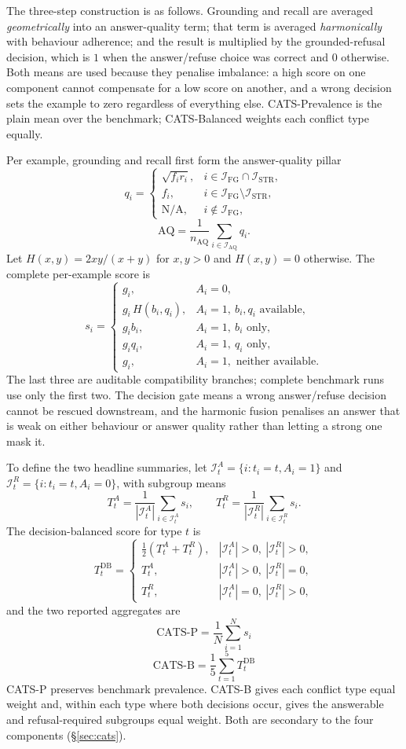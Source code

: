 The three-step construction is as follows. Grounding and recall are averaged
\emph{geometrically} into an answer-quality term; that term is averaged
\emph{harmonically} with behaviour adherence; and the result is multiplied by the
grounded-refusal decision, which is $1$ when the answer/refuse choice was correct
and $0$ otherwise. Both means are used because they penalise imbalance: a high
score on one component cannot compensate for a low score on another, and a wrong
decision sets the example to zero regardless of everything else. CATS-Prevalence
is the plain mean over the benchmark; CATS-Balanced weights each conflict type
equally.

Per example, grounding and recall first form the answer-quality pillar
\[
q_i=\begin{cases}
\sqrt{f_i r_i},& i\in\mathcal{I}_{\mathrm{FG}}\cap\mathcal{I}_{\mathrm{STR}},\\
f_i,& i\in\mathcal{I}_{\mathrm{FG}}\setminus\mathcal{I}_{\mathrm{STR}},\\
\text{N/A},& i\notin\mathcal{I}_{\mathrm{FG}},
\end{cases}
\]
\[
\mathrm{AQ}=\frac{1}{n_{\mathrm{AQ}}}\sum_{i\in\mathcal{I}_{\mathrm{AQ}}}q_i.
\]
Let $H(x,y)=2xy/(x+y)$ for $x,y>0$ and $H(x,y)=0$ otherwise. The complete
per-example score is
\[
s_i=\begin{cases}
g_i,& A_i=0,\\
g_i\,H(b_i,q_i),& A_i=1,\ b_i,q_i\text{ available},\\
g_i b_i,& A_i=1,\ b_i\text{ only},\\
g_i q_i,& A_i=1,\ q_i\text{ only},\\
g_i,& A_i=1,\text{ neither available}.
\end{cases}
\]
The last three are auditable compatibility branches; complete benchmark runs use
only the first two. The decision gate means a wrong answer/refuse decision cannot
be rescued downstream, and the harmonic fusion penalises an answer that is weak
on either behaviour or answer quality rather than letting a strong one mask it.

To define the two headline summaries, let
$\mathcal{I}^{A}_t=\{i:t_i=t,A_i=1\}$ and $\mathcal{I}^{R}_t=\{i:t_i=t,A_i=0\}$,
with subgroup means
\[
T^{A}_t=\frac{1}{|\mathcal{I}^{A}_t|}\sum_{i\in\mathcal{I}^{A}_t}s_i,
\qquad
T^{R}_t=\frac{1}{|\mathcal{I}^{R}_t|}\sum_{i\in\mathcal{I}^{R}_t}s_i.
\]
The decision-balanced score for type $t$ is
\[
T^{\mathrm{DB}}_t=\begin{cases}
\tfrac{1}{2}(T^{A}_t+T^{R}_t),& |\mathcal{I}^{A}_t|>0,\ |\mathcal{I}^{R}_t|>0,\\
T^{A}_t,& |\mathcal{I}^{A}_t|>0,\ |\mathcal{I}^{R}_t|=0,\\
T^{R}_t,& |\mathcal{I}^{A}_t|=0,\ |\mathcal{I}^{R}_t|>0,
\end{cases}
\]
and the two reported aggregates are
\[
\boxed{\ \mathrm{CATS\text{-}P}=\frac{1}{N}\sum_{i=1}^{N}s_i\ }
\]
\[
\boxed{\ \mathrm{CATS\text{-}B}=\frac{1}{5}\sum_{t=1}^{5}T^{\mathrm{DB}}_t\ }
\]
CATS-P preserves benchmark prevalence. CATS-B gives each conflict type equal
weight and, within each type where both decisions occur, gives the answerable and
refusal-required subgroups equal weight. Both are secondary to the four
components (\S\ref{sec:cats}).

